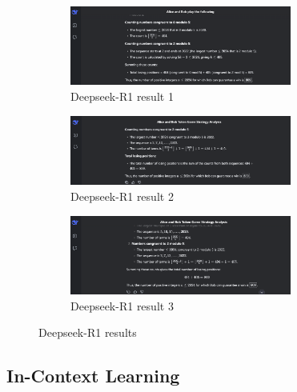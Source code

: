 \documentclass[a4paper,12pt]{article}
\begin{document}
\begin{figure}
    \begin{subfigure}[b]{\textwidth}
        \centering
        \includegraphics[width=0.8\textwidth]{figures/r1_198s.png}
        \caption{Deepseek-R1 result 1}
        \label{fig:image4}
    \end{subfigure}
    
  
    \begin{subfigure}[b]{\textwidth}
        \centering
        \includegraphics[width=0.8\textwidth]{figures/r1_179s.png}
        \caption{Deepseek-R1 result 2}
        \label{fig:image5}
    \end{subfigure}
    
    \begin{subfigure}[b]{\textwidth}
        \centering
        \includegraphics[width=0.8\textwidth]{figures/r1_138s.png}
        \caption{Deepseek-R1 result 3}
        \label{fig:image6}
    \end{subfigure}
    
    \caption{Deepseek-R1 results}
    \label{fig:dsr1_images}
\end{figure}

\subsection{In-Context Learning}
\end{document}
